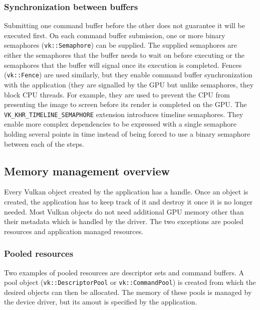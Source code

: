 \documentclass[times, utf8, zavrsni, numeric]{fer}
\begin{document}
\subsubsection{Synchronization between buffers}
Submitting one command buffer before the other does not guarantee it will be executed first. On each command buffer submission, one or more binary semaphores (\texttt{vk::Semaphore}) can be supplied. The supplied semaphores are either the \linebreak semaphores that the buffer needs to wait on before executing or the semaphores that the buffer will signal once its execution is completed. Fences (\texttt{vk::Fence}) are used similarly, but they enable command buffer synchronization with the application (they are signalled by the GPU but unlike semaphores, they block CPU threads. For example, they are used to prevent the CPU from presenting the image to screen before its render is completed on the GPU. The \texttt{VK\_KHR\_TIMELINE\_SEMAPHORE} extension introduces timeline semaphores. They enable more complex dependencies to be expressed with a single semaphore holding several points in time instead of being forced to use a binary semaphore between each of the steps.

\subsection{Memory management overview}
Every Vulkan object created by the application has a handle. Once an object is created, the application has to keep track of it and destroy it once it is no longer needed. Most Vulkan objects do not need additional GPU memory other than their metadata which is handled by the driver. The two exceptions are pooled resources and application managed resources.

\subsubsection{Pooled resources}
Two examples of pooled resources are descriptor sets and command buffers. A pool object (\texttt{vk::DescriptorPool} or \texttt{vk::CommandPool}) is created from which the desired objects can then be allocated. The memory of these pools is managed by the device driver, but its amout is specified by the application.
\end{document}
